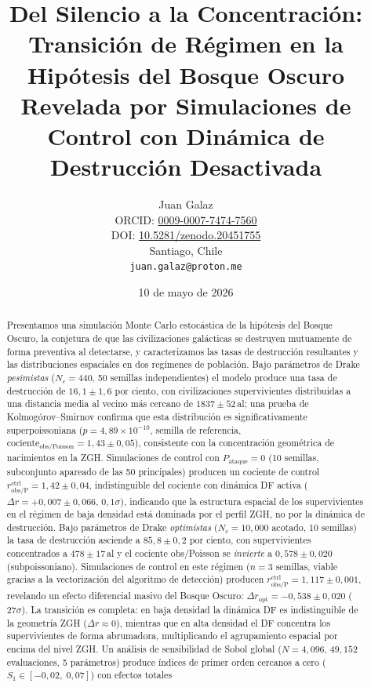 \documentclass[11pt,a4paper,onecolumn]{article}
\title{\bfseries Del Silencio a la Concentración: Transición de Régimen en la Hipótesis del Bosque Oscuro Revelada por Simulaciones de Control con Dinámica de Destrucción Desactivada}
\author{Juan Galaz\\[2mm]
\small ORCID: \href{https://orcid.org/0009-0007-7474-7560}{0009-0007-7474-7560}\\
\small DOI: \href{https://doi.org/10.5281/zenodo.20451755}{10.5281/zenodo.20451755}\\
\small Santiago, Chile\\
\small \texttt{juan.galaz@proton.me}}
\date{10 de mayo de 2026}
\begin{document}
\maketitle

\begin{abstract}
Presentamos una simulación Monte Carlo estocástica de la hipótesis del
Bosque Oscuro, la conjetura de que las civilizaciones galácticas se
destruyen mutuamente de forma preventiva al detectarse, y
caracterizamos las tasas de destrucción resultantes y las distribuciones
espaciales en dos regímenes de población.
Bajo parámetros de Drake \emph{pesimistas} ($N_c = 440$, 50 semillas
independientes) el modelo produce una tasa de destrucción de
$16{,}1 \pm 1{,}6$ por ciento, con civilizaciones supervivientes
distribuidas a una distancia media al vecino más cercano de
$1837 \pm 52$\,al; una prueba de Kolmogórov--Smirnov
confirma que esta distribución es significativamente superpoissoniana
($p = 4{,}89\times10^{-10}$, semilla de referencia,
$\text{cociente}_\text{obs/Poisson} = 1{,}43 \pm 0{,}05$),
consistente con la concentración geométrica de nacimientos en la ZGH.
Simulaciones de control con $P_\text{ataque} = 0$ (10 semillas,
subconjunto apareado de las 50 principales) producen un cociente de control
$r_\text{obs/P}^\text{ctrl} = 1{,}42 \pm 0{,}04$, indistinguible
del cociente con dinámica DF activa
($\Delta r = +0{,}007 \pm 0{,}066$, $0{,}1\sigma$), indicando que la
estructura espacial de los supervivientes en el régimen de baja densidad
está dominada por el perfil ZGH, no por la dinámica de destrucción.
Bajo parámetros de Drake \emph{optimistas} ($N_c = 10{,}000$ acotado,
10 semillas) la tasa de destrucción asciende a $85{,}8 \pm 0{,}2$ por
ciento, con supervivientes concentrados a $478 \pm 17$\,al y el cociente
obs/Poisson se \emph{invierte} a $0{,}578 \pm 0{,}020$ (subpoissoniano).
Simulaciones de control en este régimen ($n = 3$ semillas, viable gracias
a la vectorización del algoritmo de detección) producen
$r_\text{obs/P}^\text{ctrl} = 1{,}117 \pm 0{,}001$, revelando un efecto
diferencial masivo del Bosque Oscuro:
$\Delta r_\text{opt} = -0{,}538 \pm 0{,}020$ ($27\sigma$).
La transición es completa: en baja densidad la dinámica DF es
indistinguible de la geometría ZGH ($\Delta r \approx 0$), mientras que
en alta densidad el DF concentra los supervivientes de forma abrumadora,
multiplicando el agrupamiento espacial por encima del nivel ZGH.
Un análisis de sensibilidad de Sobol global ($N = 4{,}096$,
$49{,}152$ evaluaciones, 5 parámetros) produce índices de primer orden
cercanos a cero ($S_1 \in [-0{,}02,\;0{,}07]$) con efectos totales

\end{abstract}
\end{document}
